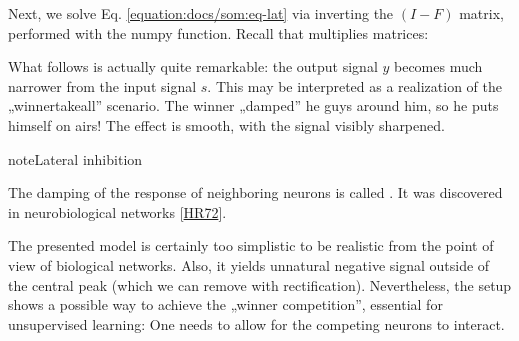 \documentclass[a4paper,12pt,polish]{jupyterBook}
\begin{document}
\sphinxAtStartPar
Next, we solve Eq. \eqref{equation:docs/som:eq-lat} via inverting the \((I-F)\) matrix, performed with the numpy  function. Recall that  multiplies matrices:
\begin{sphinxVerbatimInput}

\begin{sphinxVerbatim}[commandchars=\\\{\}]
 
                      
\PYG{p}{[}\PYG{p}{]}                             
\end{sphinxVerbatim}
\end{sphinxVerbatimInput}

\sphinxAtStartPar
What follows is actually quite remarkable: the output signal \(y\) becomes much narrower from the input signal \(s\). This may be interpreted as a realization of the „winner\sphinxhyphen{}take\sphinxhyphen{}all” scenario. The winner „damped” he guys around him, so he puts himself on airs! The effect is smooth, with the signal visibly sharpened.
\begin{sphinxVerbatimOutput}

\noindent{}
\end{sphinxVerbatimOutput}

\begin{sphinxadmonition}{note}{Lateral inhibition}

\sphinxAtStartPar
The damping of the response of neighboring neurons is called . It was discovered in neurobiological networks {[}\hyperlink{cite.docs/conclusion:id14}{HR72}{]}.
\end{sphinxadmonition}

\sphinxAtStartPar
The presented model is certainly too simplistic to be realistic from the point of view of biological networks. Also, it yields unnatural negative signal outside of the central peak (which we can remove with rectification). Nevertheless, the setup shows a possible way to achieve the „winner competition”, essential for unsupervised learning: One needs to allow for the competing neurons to interact.
\end{document}
